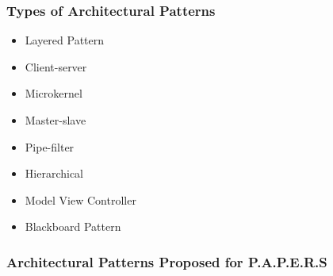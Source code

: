 \documentclass{article}
\begin{document}
		\subsubsection{Types of Architectural Patterns}
			\begin{itemize}
				\item Layered Pattern
				\item Client-server
				\item Microkernel
				\item Master-slave
				\item Pipe-filter
				\item Hierarchical
				\item Model View Controller
				\item Blackboard Pattern
			\end{itemize}
		
		\subsubsection{Architectural Patterns Proposed for P.A.P.E.R.S}
\end{document}
